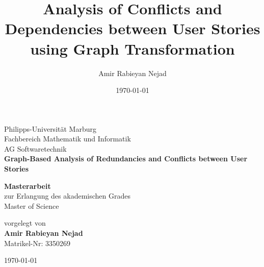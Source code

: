 \documentclass[11pt,a4paper]{article}
\title{Analysis of Conflicts and Dependencies between User Stories using Graph Transformation}
\author{Amir Rabieyan Nejad}
\date{\today}
\numberwithin{equation}{section}
\begin{document}
\begin{titlepage}
    \begin{center}
        \vspace*{1cm}
        \Large
        Philipps-Universität Marburg\\
        Fachbereich Mathematik und Informatik\\
        AG Softwaretechnik \\
        \vspace*{1cm}
        \Large
        \textbf{Graph-Based Analysis of Redundancies and Conflicts between User Stories}
            
      
        \vspace{1.5cm}
            
        \textbf{Masterarbeit}\\
        zur Erlangung des akademischen Grades \\
        Master of Science
        
        \vspace{1.5cm}
        vorgelegt von\\
        \textbf{Amir Rabieyan Nejad}\\
        Matrikel-Nr: 3350269
            
    
            
        \vspace{1.5cm}
            
        
            
        
        
        \today\\
        
    \end{center}
\end{titlepage}
\pagestyle{empty}
\newpage\null\newpage

\newpage\null\newpage

\newpage\null\newpage


\newpage
\pagestyle{plain}
\tableofcontents
\newpage\null\newpage












\newpage



   
\end{document}
